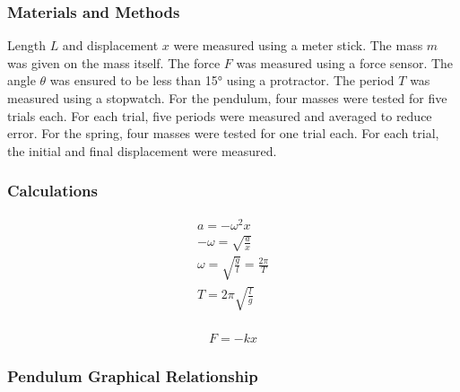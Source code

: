 \documentclass[10pt]{beamer}
\begin{document}
\begin{frame}
    \frametitle{Materials and Methods}
    Length $L$ and displacement $x$ were measured using a meter stick. The mass
    $m$ was given on the mass itself. The force $F$ was measured using a force
    sensor. The angle $\theta$ was ensured to be less than \ang{15} using a
    protractor. The period $T$ was measured using a stopwatch. For the
    pendulum, four masses were tested for five trials each. For each trial,
    five periods were measured and averaged to reduce error. For the spring,
    four masses were tested for one trial each. For each trial, the initial and
    final displacement were measured.
\end{frame}

\begin{frame}
    \frametitle{Calculations}
    \begin{minipage}{0.5\textwidth}
        \begin{gather}
            a = -\omega^2x \\
            -\omega = \sqrt{\frac{a}{x}} \\
            \omega = \sqrt{\frac{g}{l}} = \frac{2\pi}{T} \\
            T = 2\pi\sqrt{\frac{l}{g}} \\
        \end{gather}
    \end{minipage}%
    \begin{minipage}{0.5\textwidth}
        \begin{gather}
            F = -kx
        \end{gather}
    \end{minipage}
\end{frame}

\begin{frame}
    \frametitle{Pendulum Graphical Relationship}
    \centering
\end{frame}
\end{document}

